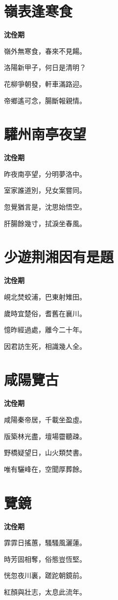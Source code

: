 \documentclass[12pt,a4paper]{ctexbook}
\begin{document}
\section{嶺表逢寒食}
\textbf{沈佺期}\par\vspace{0.5em}
嶺外無寒食，春來不見餳。\par
洛陽新甲子，何日是清明？\par
花柳爭朝發，軒車滿路迎。\par
帝鄉遙可念，腸斷報親情。\par

\section{驩州南亭夜望}
\textbf{沈佺期}\par\vspace{0.5em}
昨夜南亭望，分明夢洛中。\par
室家誰道別，兒女案嘗同。\par
忽覺猶言是，沈思始悟空。\par
肝腸餘幾寸，拭淚坐春風。\par

\section{少遊荆湘因有是題}
\textbf{沈佺期}\par\vspace{0.5em}
峴北焚蛟浦，巴東射雉田。\par
歲時宜楚俗，耆舊在襄川。\par
憶昨經過處，離今二十年。\par
因君訪生死，相識幾人全。\par

\section{咸陽覽古}
\textbf{沈佺期}\par\vspace{0.5em}
咸陽秦帝居，千載坐盈虛。\par
版築林光盡，壇場霤聽疎。\par
野橋疑望日，山火類焚書。\par
唯有驪峰在，空聞厚葬餘。\par

\section{覽鏡}
\textbf{沈佺期}\par\vspace{0.5em}
霏霏日搖蕙，騷騷風灑蓮。\par
時芳固相奪，俗態豈恆堅。\par
恍忽夜川裏，蹉跎朝鏡前。\par
紅顏與壯志，太息此流年。\par
\end{document}
